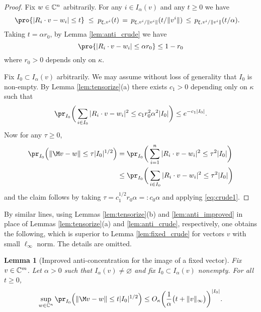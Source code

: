 \documentclass[aop,preprint]{imsart}
\theoremstyle{plain}
\newtheorem{lemma}[theorem]{Lemma}
\theoremstyle{definition}
\theoremstyle{remark}
\numberwithin{equation}{section}
\numberwithin{theorem}{section}
\begin{document}
\begin{proof}
Fix $w\in {\mathbb C}^n$ arbitrarily. 
For any $i\in I_\alpha(v)$ and any $t\ge0$ we have
\begin{align*}
\pro{ |R_i\cdot v -w_i|\le t} &\;\le\; p_{\xi,v^i}(t) \,=\,p_{\xi,v^i/\|v^i\|}(t/\|v^i\|) \,\le\, p_{\xi,v^i/\|v^i\|}(t/\alpha).
\end{align*}
Taking $t=\alpha r_0$, by Lemma \ref{lem:anti_crude} we have
\begin{equation}
\pro{ |R_i\cdot v -w_i|\le \alpha r_0} \le 1-r_0
\end{equation}
where $r_0>0$ depends only on $\kappa$.

Fix $I_0\subset I_\alpha(v)$ arbitrarily. We may assume without loss of generality that $I_0$ is non-empty. 
By Lemma \ref{lem:tensorize}(a) there exists $c_1>0$ depending only on $\kappa$ such that
\begin{equation}	\label{eq:crude1}
\pr_{I_0}\bigg( \sum_{i\in I_0} |R_i\cdot v - w_i|^2 \le c_1 r_0^2\alpha^2 |I_0|\bigg) \le e^{-c_1|I_0|}.
\end{equation}
Now for any $\tau\ge 0$, 
\begin{align*}
\pr_{I_0}\Big( \|\M v -w\| \le \tau |I_0|^{1/2}\Big) &= \pr_{I_0}\bigg( \sum_{i=1}^n |R_i\cdot v -w_i|^2 \le \tau^2 |I_0|\bigg)\\
&\le \pr_{I_0}\bigg( \sum_{i\in I_0} |R_i\cdot v -w_i|^2 \le \tau^2 |I_0|\bigg)
\end{align*}
and the claim follows by taking $\tau=c_1^{1/2}r_0\alpha =: c_0\alpha$ and applying \eqref{eq:crude1}.
\end{proof}

By similar lines, using Lemmas \ref{lem:tensorize}(b) and \ref{lem:anti_improved} in place of Lemmas \ref{lem:tensorize}(a) and \ref{lem:anti_crude}, respectively, one obtains the following, which is superior to Lemma \ref{lem:fixed_crude} for vectors $v$ with small $\ell_\infty$ norm. 
The details are omitted.

\begin{lemma}[Improved anti-concentration for the image of a fixed vector]	\label{lem:fixed_improved}
Fix $v\in {\mathbb C}^m$. 
Let $\alpha>0$ such that $I_\alpha(v)\ne \varnothing$ and fix $I_0\subset I_\alpha(v)$ nonempty.
For all $t\ge 0$,
\begin{equation}
\sup_{w\in \C^n} \pr_{I_0}\Big( \|\M v -w\| \le t|I_0|^{1/2}\Big) \le O_\kappa\bigg(\frac{1}{\alpha}\big( t+\|v\|_\infty\big) \bigg)^{|I_0|}.
\end{equation}
\end{lemma}
\end{document}
